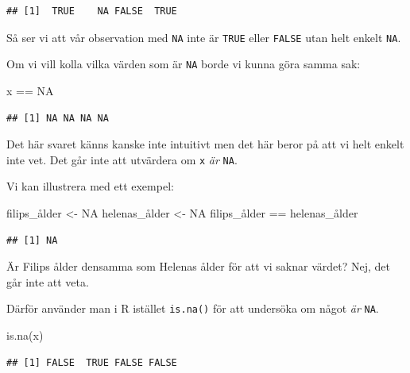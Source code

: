 \documentclass[
]{book}
\newenvironment{Shaded}{\begin{snugshade}}{\end{snugshade}}
\newcommand{\ConstantTok}[1]{\textcolor[rgb]{0.00,0.00,0.00}{#1}}
\newcommand{\FunctionTok}[1]{\textcolor[rgb]{0.00,0.00,0.00}{#1}}
\newcommand{\NormalTok}[1]{#1}
\newcommand{\OtherTok}[1]{\textcolor[rgb]{0.56,0.35,0.01}{#1}}
\newcommand{\SpecialCharTok}[1]{\textcolor[rgb]{0.00,0.00,0.00}{#1}}
\begin{document}
\begin{verbatim}
## [1]  TRUE    NA FALSE  TRUE
\end{verbatim}

Så ser vi att vår observation med \texttt{NA} inte är \texttt{TRUE} eller \texttt{FALSE} utan helt enkelt \texttt{NA}.

Om vi vill kolla vilka värden som är \texttt{NA} borde vi kunna göra samma sak:

\begin{Shaded}
\begin{Highlighting}[]
\NormalTok{x }\SpecialCharTok{==} \ConstantTok{NA}
\end{Highlighting}
\end{Shaded}

\begin{verbatim}
## [1] NA NA NA NA
\end{verbatim}

Det här svaret känns kanske inte intuitivt men det här beror på att vi helt enkelt inte vet. Det går inte att utvärdera om \texttt{x} \emph{är} \texttt{NA}.

Vi kan illustrera med ett exempel:

\begin{Shaded}
\begin{Highlighting}[]
\NormalTok{filips\_ålder }\OtherTok{\textless{}{-}} \ConstantTok{NA}
\NormalTok{helenas\_ålder }\OtherTok{\textless{}{-}} \ConstantTok{NA}
\NormalTok{filips\_ålder }\SpecialCharTok{==}\NormalTok{ helenas\_ålder}
\end{Highlighting}
\end{Shaded}

\begin{verbatim}
## [1] NA
\end{verbatim}

Är Filips ålder densamma som Helenas ålder för att vi saknar värdet? Nej, det går inte att veta.

Därför använder man i R istället \texttt{is.na()} för att undersöka om något \emph{är} \texttt{NA}.

\begin{Shaded}
\begin{Highlighting}[]
\FunctionTok{is.na}\NormalTok{(x)}
\end{Highlighting}
\end{Shaded}

\begin{verbatim}
## [1] FALSE  TRUE FALSE FALSE
\end{verbatim}
\end{document}
